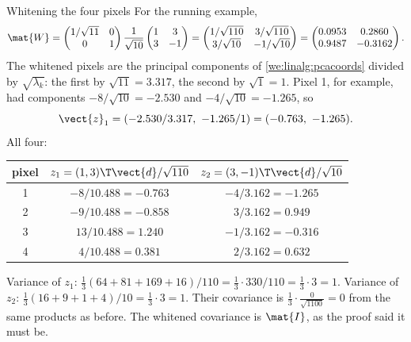 \begin{worked}[label={we:linalg:whiten}]{Whitening the four pixels}
For the running example,
\[
\mat{W} = \begin{pmatrix} 1/\sqrt{11} & 0\\ 0 & 1\end{pmatrix}
\frac{1}{\sqrt{10}}\begin{pmatrix} 1 & 3\\ 3 & -1\end{pmatrix}
= \begin{pmatrix} 1/\sqrt{110} & 3/\sqrt{110}\\ 3/\sqrt{10} & -1/\sqrt{10}\end{pmatrix}
= \begin{pmatrix} 0.0953 & 0.2860\\ 0.9487 & -0.3162\end{pmatrix}.
\]
The whitened pixels are the principal components of \cref{we:linalg:pcacoords} divided by
$\sqrt{\lambda_k}$: the first by $\sqrt{11} = 3.317$, the second by $\sqrt1 = 1$. Pixel 1, for
example, had components $-8/\sqrt{10} = -2.530$ and $-4/\sqrt{10} = -1.265$, so
\[
\vect{z}_1 = (-2.530/3.317,\ -1.265/1) = (-0.763,\ -1.265).
\]
All four:
\begin{center}
\begin{tabular}{ccc}
\toprule
pixel & $z_1 = (1,3)\T\vect{d}/\sqrt{110}$ & $z_2 = (3,-1)\T\vect{d}/\sqrt{10}$\\
\midrule
1 & $-8/10.488 = -0.763$ & $-4/3.162 = -1.265$\\
2 & $-9/10.488 = -0.858$ & $3/3.162 = 0.949$\\
3 & $13/10.488 = 1.240$  & $-1/3.162 = -0.316$\\
4 & $4/10.488 = 0.381$   & $2/3.162 = 0.632$\\
\bottomrule
\end{tabular}
\end{center}
Variance of $z_1$: $\frac13(64 + 81 + 169 + 16)/110 = \frac13\cdot 330/110 = \frac13\cdot3 = 1$.
Variance of $z_2$: $\frac13(16 + 9 + 1 + 4)/10 = \frac13\cdot3 = 1$. Their covariance is
$\frac{1}{3}\cdot\frac{0}{\sqrt{1100}} = 0$ from the same products as before. The whitened
covariance is $\mat{I}$, as the proof said it must be.
\end{worked}

